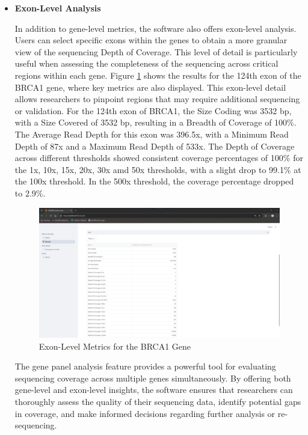 \begin{itemize}
\item \textbf{Exon-Level Analysis}

In addition to gene-level metrics, the software also offers exon-level analysis. Users can select specific exons within the genes to obtain a more granular view of the sequencing Depth of Coverage. This level of detail is particularly useful when assessing the completeness of the sequencing across critical regions within each gene. Figure \ref{fig:exon_results} shows the results for the 124th exon of the BRCA1 gene, where key metrics are also displayed. This exon-level detail allows researchers to pinpoint regions that may require additional sequencing or validation. For the 124th exon of BRCA1, the Size Coding was 3532 \ac{bp}, with a Size Covered of 3532 \ac{bp}, resulting in a Breadth of Coverage of 100\%. The Average Read Depth for this exon was 396.5x, with a Minimum Read Depth of 87x and a Maximum Read Depth of 533x. The Depth of Coverage across different thresholds showed consistent coverage percentages of 100\% for the 1x, 10x, 15x, 20x, 30x amd 50x thresholds, with a slight drop to 99.1\% at the 100x threshold. In the 500x threshold, the coverage percentage dropped to 2.9\%.

\begin{figure}[H]
    \centering
    \includegraphics[width=\textwidth]{figs/v3.12.png}
    \caption{Exon-Level Metrics for the BRCA1 Gene}
    \label{fig:exon_results}
\end{figure}

The gene panel analysis feature provides a powerful tool for evaluating sequencing coverage across multiple genes simultaneously. By offering both gene-level and exon-level insights, the software ensures that researchers can thoroughly assess the quality of their sequencing data, identify potential gaps in coverage, and make informed decisions regarding further analysis or re-sequencing.

\end{itemize}

